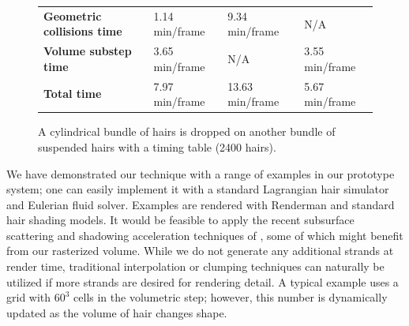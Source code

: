 \begin{figure}[htb]
{\begin{tabular}[t]{p{.20\linewidth}|p{.22\linewidth}p{.22\linewidth}p{.22\linewidth}}
\hfill\textbf{Geometric collisions time} &\hspace{5pt}1.14 min/frame &\hspace{5pt}9.34 min/frame &\hspace{5pt}N/A \\
\hfill\textbf{Volume substep time} &\hspace{5pt}3.65 min/frame &\hspace{5pt}N/A & \hspace{5pt}3.55 min/frame \\
\hfill\textbf{Total time} & \hspace{5pt}7.97 min/frame &\hspace{5pt}13.63 min/frame &\hspace{5pt}5.67 min/frame \\
\end{tabular}
}
%
  \caption{\label{fig:tubes} A cylindrical bundle of hairs is dropped on another
  bundle of suspended hairs with a timing table (2400 hairs). }
\end{figure}

We have demonstrated our technique with a range of examples in our prototype
system; one can easily implement it with a standard Lagrangian hair simulator
and Eulerian fluid solver.  Examples are rendered with Renderman and standard hair
shading models. It would be feasible to apply the recent subsurface scattering and
shadowing acceleration techniques of
\cite{moon:2008:hair-render,zinke:2008:hair-render,bertails:2005:render}, some of
which might benefit from our rasterized volume.  While we
do not generate any additional strands at render time, traditional
interpolation or clumping techniques can naturally be utilized if more strands
are desired for rendering detail. A typical example uses a grid with
$60^3$ cells in the volumetric step; however, this number is
dynamically updated as the volume of hair changes shape.

